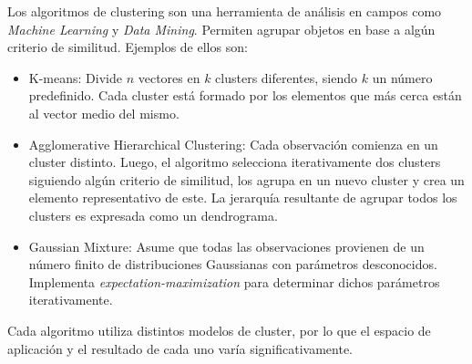 \vspace{0.3cm}

Los algoritmos de clustering son una herramienta de an\'alisis en campos como
\textit{Machine Learning} y \textit{Data Mining}. Permiten agrupar objetos
en base a alg\'un criterio de similitud. Ejemplos de ellos son: 

\begin{itemize}
    \item K-means: Divide $n$ vectores en $k$ clusters diferentes, siendo $k$
                   un n\'umero predefinido. Cada cluster est\'a formado 
                   por los elementos que m\'as cerca est\'an al vector medio del
                   mismo. \cite{Hartigan1979}
    \item Agglomerative Hierarchical Clustering: Cada observaci\'on comienza en 
                   un cluster distinto. Luego, el algoritmo selecciona iterativamente
                   dos clusters siguiendo alg\'un criterio de similitud, los agrupa
                   en un nuevo cluster y crea un elemento representativo de este.
                   La jerarqu\'ia resultante de agrupar todos los clusters
                   es expresada como un dendrograma. \cite{Mining2009}
    \item Gaussian Mixture: Asume que todas las observaciones provienen de un 
                   n\'umero finito de distribuciones Gaussianas con par\'ametros
                   desconocidos. Implementa \textit{expectation-maximization} para
                   determinar dichos par\'ametros iterativamente. \cite{Mining2009}
\end{itemize}

Cada algoritmo utiliza distintos modelos de cluster, por lo que el espacio de
aplicaci\'on y el resultado de cada uno var\'ia significativamente. \\

